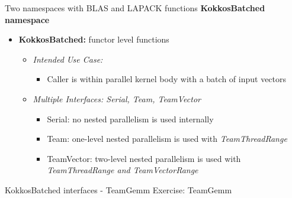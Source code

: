 \begin{frame}[fragile]{Two namespaces with BLAS and LAPACK functions}
  \textbf{KokkosBatched namespace} \\
  \vspace{10pt}
  \begin{itemize}
    \item \textbf{KokkosBatched:} functor level functions
    \begin{itemize}
      \item \textit{Intended Use Case:}
      \begin{itemize}
        \item Caller is within parallel kernel body with a batch of input vectors
      \end{itemize}
      \item \textit{Multiple Interfaces: Serial, Team, TeamVector}
      \begin{itemize}
        \item Serial: no nested parallelism is used internally
        \item Team: one-level nested parallelism is used with \textit{TeamThreadRange}

        \item TeamVector: two-level nested parallelism is used with \textit{TeamThreadRange and TeamVectorRange}

      \end{itemize}
    \end{itemize}
  \end{itemize}
\end{frame}

\begin{frame}[fragile]{KokkosBatched interfaces - TeamGemm}
  \Huge {Exercise: TeamGemm}
\end{frame}

